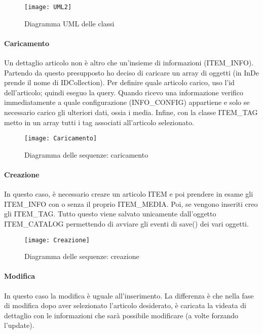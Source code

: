 \begin{figure}[!h] 
	\centering 
	\texttt{[image: UML2]} 
	\caption{Diagramma UML delle classi}
	\label{UML}
\end{figure}

\paragraph{Caricamento}
Un dettaglio articolo non è altro che un'insieme di informazioni (ITEM\_INFO). Partendo da questo presupposto ho deciso di caricare un array di oggetti (in InDe prende il nome di IDCollection).
Per definire quale articolo carico, uso l'id dell'articolo; quindi eseguo la query. Quando ricevo una informazione verifico immediatamente a quale configurazione (INFO\_CONFIG) appartiene e solo se necessario carico gli ulteriori dati, ossia i media. Infine, con la classe ITEM\_TAG metto in un array tutti i tag associati all'articolo selezionato.

\begin{figure}[!h] 
	\centering 
	\texttt{[image: Caricamento]} 
	\caption{Diagramma delle sequenze: caricamento}
	\label{DS:caricamento}
\end{figure}

\paragraph{Creazione}
In questo caso, è necessario creare un articolo ITEM e poi prendere in esame gli ITEM\_INFO con o senza il proprio ITEM\_MEDIA. Poi, se vengono inseriti creo gli ITEM\_TAG. Tutto questo viene salvato unicamente dall'oggetto ITEM\_CATALOG permettendo di avviare gli eventi di save() dei vari oggetti.

\begin{figure}[!h] 
	\centering 
	\texttt{[image: Creazione]} 
	\caption{Diagramma delle sequenze: creazione}
	\label{DS:creazione}
\end{figure}

\paragraph{Modifica}
In questo caso la modifica è uguale all'inserimento. La differenza è che nella fase di modifica dopo aver selezionato l'articolo desiderato, è caricata la videata di dettaglio con le informazioni che sarà possibile modificare (a volte forzando l'update).

